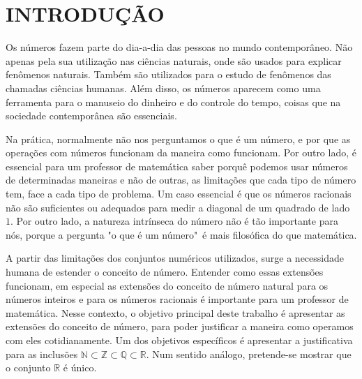 \documentclass[../main.tex]{subfiles}
\begin{document}
\chapter{INTRODUÇÃO} %



    
    
    
    
    


Os números fazem parte do dia-a-dia das pessoas no mundo contemporâneo. Não apenas pela sua utilização nas ciências naturais, onde são usados para explicar fenômenos naturais. Também são utilizados para o estudo de fenômenos das chamadas ciências humanas. Além disso, os números aparecem como uma ferramenta para o manuseio do dinheiro e do controle do tempo, coisas que na sociedade contemporânea são essenciais.

Na prática, normalmente não nos perguntamos o que é um número, e por que as operações com números funcionam da maneira como funcionam. Por outro lado, é essencial para um professor de matemática saber porquê podemos usar números de determinadas maneiras e não de outras, as limitações que cada tipo de número tem, face a cada tipo de problema. Um caso essencial é que os números racionais não são suficientes ou adequados para medir a diagonal de um quadrado de lado $1$. Por outro lado, a natureza intrínseca do número não é tão importante para nós, porque a pergunta "o que é um número"\ é mais  filosófica do que matemática.

A partir das limitações dos conjuntos numéricos utilizados, surge a necessidade humana de estender o conceito de número. Entender como essas extensões funcionam, em especial as extensões do conceito de número natural para os números inteiros e para os números racionais é importante para um professor de matemática. Nesse contexto, o objetivo principal deste trabalho é apresentar as extensões do conceito de número, para poder justificar a maneira como operamos com eles cotidianamente. Um dos objetivos específicos é apresentar a justificativa para as inclusões $\mathbb{N} \subset \mathbb{Z} \subset \mathbb{Q} \subset \mathbb{R}$. Num sentido análogo, pretende-se mostrar que o conjunto $\mathbb{R}$ é único. 
\end{document}
